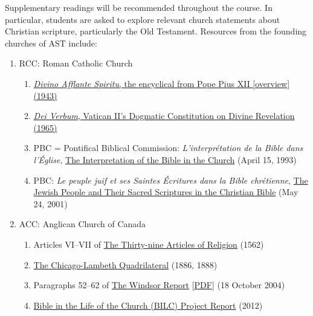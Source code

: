 \documentclass[titlepage]{article}
\begin{document}
Supplementary readings will be recommended throughout the course. In
particular, students are asked to explore relevant church statements
about Christian scripture, particularly the Old Testament. Resources
from the founding churches of AST include:

\begin{enumerate}

\item RCC: Roman Catholic Church

	\begin{enumerate}
	\item \href{}{\emph{Divino Afflante Spiritu}, the encyclical from Pope Pius XII [\href{http://www.bc.edu/schools/stm/crossroads/resources/deathofjesus/intro/the_catholic_approachtothebible.html}{overview}] (1943)}
	\item \href{}{\emph{Dei Verbum}, Vatican II's Dogmatic Constitution on Divine Revelation (1965)}
	\item PBC = Pontifical Biblical Commission: \emph{L'interprétation de la Bible dans l'Église}, \href{http://www.catholic-resources.org/ChurchDocs/PBC_Interp.htm}{The Interpretation of the Bible in the Church} (April 15, 1993)
	\item PBC: \emph{Le peuple juif et ses Saintes Écritures dans la Bible chrétienne}, \href{http://www.vatican.va/roman_curia/congregations/cfaith/pcb_documents/rc_con_cfaith_doc_20020212_popolo-ebraico_en.html}{The Jewish People and Their Sacred Scriptures in the Christian Bible} (May 24, 2001)
	\end{enumerate}

\item ACC: Anglican Church of Canada

	\begin{enumerate}
	\item Articles VI–VII of \href{https://www.churchofengland.org/prayer-worship/worship/book-of-common-prayer/articles-of-religion.aspx}{The Thirty-nine Articles of Religion} (1562)
	\item \href{http://anglicansonline.org/basics/Chicago_Lambeth.html}{The Chicago-Lambeth Quadrilateral} (1886, 1888)
	\item Paragraphs 52–62 of \href{http://www.anglicancommunion.org/resources/document-library.aspx?author=The+Windsor+Process&language=English}{The Windsor Report} [\href{http://www.anglicancommunion.org/media/68225/windsor2004full.pdf}{PDF}] (18 October 2004)
	\item \href{http://www.anglicancommunion.org/media/98131/Final-Report-for-the-web.pdf}{Bible in the Life of the Church (BILC) Project Report} (2012)
	\end{enumerate}


\end{enumerate}
\end{document}
